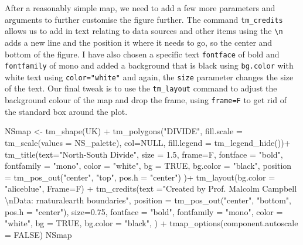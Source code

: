 \documentclass[
  letterpaper,
  DIV=11,
  numbers=noendperiod]{scrartcl}
\newenvironment{Shaded}{\begin{snugshade}}{\end{snugshade}}
\newcommand{\AttributeTok}[1]{\textcolor[rgb]{0.40,0.45,0.13}{#1}}
\newcommand{\ConstantTok}[1]{\textcolor[rgb]{0.56,0.35,0.01}{#1}}
\newcommand{\FloatTok}[1]{\textcolor[rgb]{0.68,0.00,0.00}{#1}}
\newcommand{\FunctionTok}[1]{\textcolor[rgb]{0.28,0.35,0.67}{#1}}
\newcommand{\NormalTok}[1]{\textcolor[rgb]{0.00,0.23,0.31}{#1}}
\newcommand{\OtherTok}[1]{\textcolor[rgb]{0.00,0.23,0.31}{#1}}
\newcommand{\SpecialCharTok}[1]{\textcolor[rgb]{0.37,0.37,0.37}{#1}}
\newcommand{\StringTok}[1]{\textcolor[rgb]{0.13,0.47,0.30}{#1}}
\begin{document}
After a reasonably simple map, we need to add a few more parameters and
arguments to further customise the figure further. The command
\texttt{tm\_credits} allows us to add in text relating to data sources
and other items using the \texttt{\textbackslash{}n} adds a new line and
the position it where it needs to go, so the center and bottom of the
figure. I have also chosen a specific text \texttt{fontface} of bold and
\texttt{fontfamily} of mono and added a background that is black using
\texttt{bg.color} with white text using \texttt{color="white"} and
again, the \texttt{size} parameter changes the size of the text. Our
final tweak is to use the \texttt{tm\_layout} command to adjust the
background colour of the map and drop the frame, using \texttt{frame=F}
to get rid of the standard box around the plot.

\begin{Shaded}
\begin{Highlighting}[]
\NormalTok{NSmap }\OtherTok{\textless{}{-}}
  \FunctionTok{tm\_shape}\NormalTok{(UK) }\SpecialCharTok{+}
  \FunctionTok{tm\_polygons}\NormalTok{(}\StringTok{"DIVIDE"}\NormalTok{,}
              \AttributeTok{fill.scale =} \FunctionTok{tm\_scale}\NormalTok{(}\AttributeTok{values =}\NormalTok{ NS\_palette),}
              \AttributeTok{col=}\ConstantTok{NULL}\NormalTok{, }\AttributeTok{fill.legend =} \FunctionTok{tm\_legend\_hide}\NormalTok{())}\SpecialCharTok{+}
  \FunctionTok{tm\_title}\NormalTok{(}\AttributeTok{text=}\StringTok{"North{-}South Divide"}\NormalTok{, }\AttributeTok{size =} \FloatTok{1.5}\NormalTok{,}
           \AttributeTok{frame=}\NormalTok{F, }\AttributeTok{fontface =} \StringTok{"bold"}\NormalTok{, }\AttributeTok{fontfamily =} \StringTok{"mono"}\NormalTok{,}
           \AttributeTok{color =} \StringTok{"white"}\NormalTok{, }\AttributeTok{bg =} \ConstantTok{TRUE}\NormalTok{, }\AttributeTok{bg.color =} \StringTok{"black"}\NormalTok{, }
           \AttributeTok{position =} \FunctionTok{tm\_pos\_out}\NormalTok{(}\StringTok{"center"}\NormalTok{, }\StringTok{"top"}\NormalTok{, }\AttributeTok{pos.h =} \StringTok{"center"}\NormalTok{) )}\SpecialCharTok{+}
  \FunctionTok{tm\_layout}\NormalTok{(}\AttributeTok{bg.color =} \StringTok{"aliceblue"}\NormalTok{, }\AttributeTok{Frame=}\NormalTok{F)  }\SpecialCharTok{+}
  \FunctionTok{tm\_credits}\NormalTok{(}\AttributeTok{text =}\StringTok{"Created by Prof. Malcolm Campbell }\SpecialCharTok{\textbackslash{}n}\StringTok{Data: rnaturalearth boundaries"}\NormalTok{,}
             \AttributeTok{position =} \FunctionTok{tm\_pos\_out}\NormalTok{(}\StringTok{"center"}\NormalTok{, }\StringTok{"bottom"}\NormalTok{, }\AttributeTok{pos.h =} \StringTok{"center"}\NormalTok{),}
             \AttributeTok{size=}\FloatTok{0.75}\NormalTok{, }\AttributeTok{fontface =} \StringTok{"bold"}\NormalTok{, }\AttributeTok{fontfamily =} \StringTok{"mono"}\NormalTok{,}
             \AttributeTok{color =} \StringTok{"white"}\NormalTok{, }\AttributeTok{bg =} \ConstantTok{TRUE}\NormalTok{, }\AttributeTok{bg.color =} \StringTok{"black"}\NormalTok{, ) }\SpecialCharTok{+}
  \FunctionTok{tmap\_options}\NormalTok{(}\AttributeTok{component.autoscale =} \ConstantTok{FALSE}\NormalTok{)}
\NormalTok{NSmap}
\end{Highlighting}
\end{Shaded}
\end{document}
